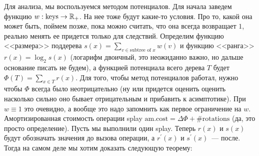 Для анализа, мы воспользуемся методом потенциалов. Для начала заведем функцию $w: \text{keys} \to {\mathbb R}_{+}$. На нее тоже будут какие-то условия. Про то, какой она может быть, поймем позже, пока можно считать, что она всегда возвращает $1$, реально менять ее придется только для следствий. Определим функцию <<размера>> поддерева $s(x) = \sum_{v \in \text{subtree of } x} w(v)$ и функцию <<ранга>> $r(x) = \log_2 s(x)$ (логарифм двоичный, это неожиданно важно, но дальше основание писать не будем), а функцией потенциала всего дерева $T$ будет $\Phi(T) = \sum_{x \in T} r(x)$. Для того, чтобы метод потенциалов работал, нужно чтобы $\Phi$ всегда было неотрицательно (ну или придется оценить оценить насколько сильно оно бывает отрицательным и прибавить к асимптотике). При $w \equiv 1$ это очевидно, а вообще это надо запомнить как первое ограничение на $w$. Амортизированная стоимость операции splay $\text{am.cost} = \Delta\Phi + \#\text{rotations}$ (да, это просто определение). Пусть мы выполнили один splay. Теперь $r(x)$ и $s(x)$ будут обозначать значения до вызова операции, а $r^\prime(x)$ и $s^\prime(x)$~--- после. Тогда на самом деле мы хотим доказать следующую теорему:

